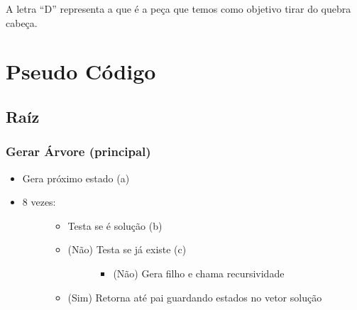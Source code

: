 \documentclass[letterpaper,10pt,openany,oneside,portuges]{sphinxmanual}
\begin{document}
\begin{DUlineblock}{0em}
\item[] A letra “D” representa a  que é a peça que temos como objetivo tirar do quebra cabeça.
\end{DUlineblock}


\chapter{Pseudo Código}
\label{\detokenize{pseudo:pseudo-codigo}}\label{\detokenize{pseudo::doc}}

\section{Raíz}
\label{\detokenize{pseudo:raiz}}

\subsection{Gerar Árvore (principal)}
\label{\detokenize{pseudo:gerar-arvore-principal}}\begin{itemize}
\item {} 
Gera próximo estado  (a)

\item {} \begin{description}
\item[{8 vezes:}] \leavevmode\begin{itemize}
\item {} 
Testa se é solução (b)

\item {} \begin{description}
\item[{(Não) Testa se já existe (c)}] \leavevmode\begin{itemize}
\item {} 
(Não) Gera filho e chama recursividade

\end{itemize}

\end{description}

\item {} 
(Sim) Retorna até pai guardando estados no vetor solução

\end{itemize}

\end{description}

\end{itemize}
\end{document}
